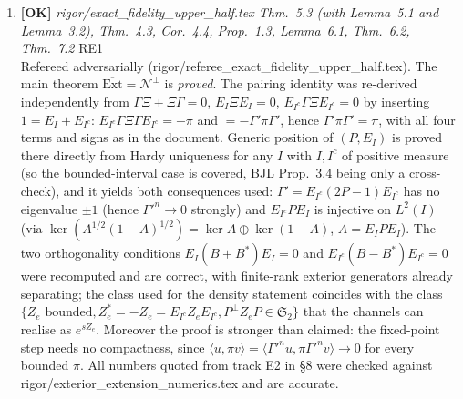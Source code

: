 \documentclass[11pt]{article}
\begin{document}
\begin{enumerate}[leftmargin=1.6em,itemsep=6pt]
\item \textbf{[OK]} \emph{rigor/exact\_fidelity\_upper\_half.tex Thm.~5.3 (with Lemma~5.1 and Lemma~3.2), Thm.~4.3, Cor.~4.4, Prop.~1.3, Lemma~6.1, Thm.~6.2, Thm.~7.2} \hfill\textsc{RE1}\\ Refereed adversarially (rigor/referee\_exact\_fidelity\_upper\_half.tex). The main theorem \(\overline{\mathrm{Ext}}=\mathcal N^{\perp}\) is \emph{proved}. The pairing identity was re-derived independently from \(\Gamma\Xi+\Xi\Gamma=0\), \(E_I\Xi E_I=0\), \(E_{I^c}\Gamma\Xi E_{I^c}=0\) by inserting \(1=E_I+E_{I^c}\): \(E_{I^c}\Gamma\Xi\Gamma E_{I^c}=-\pi\) and \(=-\Gamma'\pi\Gamma'\), hence \(\Gamma'\pi\Gamma'=\pi\), with all four terms and signs as in the document. Generic position of \((P,E_I)\) is proved there directly from Hardy uniqueness for any \(I\) with \(I,I^c\) of positive measure (so the bounded-interval case is covered, BJL Prop.~3.4 being only a cross-check), and it yields both consequences used: \(\Gamma'=E_{I^c}(2P-1)E_{I^c}\) has no eigenvalue \(\pm1\) (hence \(\Gamma'^n\to0\) strongly) and \(E_{I^c}PE_I\) is injective on \(L^2(I)\) (via \(\ker(A^{1/2}(1-A)^{1/2})=\ker A\oplus\ker(1-A)\), \(A=E_IPE_I\)). The two orthogonality conditions \(E_I(B+B^{*})E_I=0\) and \(E_{I^c}(B-B^{*})E_{I^c}=0\) were recomputed and are correct, with finite-rank exterior generators already separating; the class used for the density statement coincides with the class \(\{Z_e \text{ bounded}, Z_e^{*}=-Z_e=E_{I^c}Z_eE_{I^c}, P^{\perp}Z_eP\in\mathfrak S_2\}\) that the channels can realise as \(e^{sZ_e}\). Moreover the proof is stronger than claimed: the fixed-point step needs no compactness, since \(\langle u,\pi v\rangle=\langle\Gamma'^nu,\pi\Gamma'^nv\rangle\to0\) for every bounded \(\pi\). All numbers quoted from track E2 in \S8 were checked against rigor/exterior\_extension\_numerics.tex and are accurate.
\end{enumerate}

\end{document}
